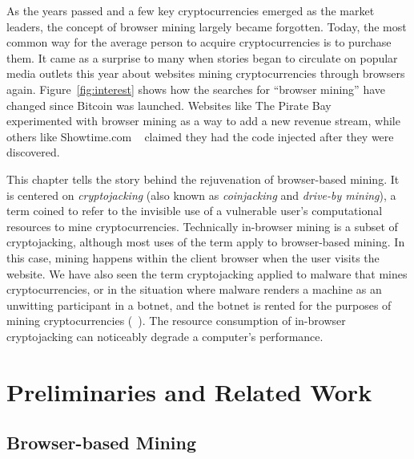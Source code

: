 As the years passed and a few key cryptocurrencies emerged as the market leaders, the concept of browser mining largely became forgotten. Today, the most common way for the average person to acquire cryptocurrencies is to purchase them. It came as a surprise to many when stories began to circulate on popular media outlets this year about websites mining cryptocurrencies through browsers again. Figure~\ref{fig:interest} shows how the searches for ``browser mining'' have changed since Bitcoin was launched. Websites like The Pirate Bay ~\cite{piratesbayhive} experimented with browser mining as a way to add a new revenue stream, while others like Showtime.com ~\cite{showtimehive} claimed they had the code injected after they were discovered. 

This chapter tells the story behind the rejuvenation of browser-based mining. It is centered on \textit{cryptojacking} (also known as \textit{coinjacking} and \textit{drive-by mining}), a term coined to refer to the invisible use of a vulnerable user's computational resources to mine cryptocurrencies. Technically in-browser mining is a subset of cryptojacking, although most uses of the term apply to browser-based mining. In this case, mining happens within the client browser when the user visits the website. We have also seen the term cryptojacking applied to malware that mines cryptocurrencies, or in the situation where malware renders a machine as an unwitting participant in a botnet, and the botnet is rented for the purposes of mining cryptocurrencies (\cf~\cite{huang2014botcoin}). The resource consumption of in-browser cryptojacking can noticeably degrade a computer's performance.

%
%
%
%
%
%

\section{Preliminaries and Related Work}

\subsection{Browser-based Mining}\label{sec:mininghistory}

